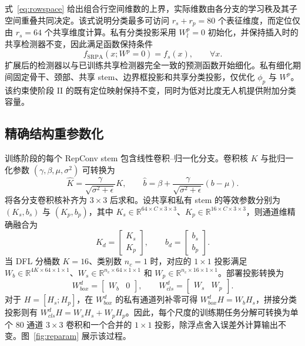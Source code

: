 式~\eqref{eq:rowspace} 给出组合行空间维数的上界，实际维数由各分支的学习秩及其子空间重叠共同决定。该式说明分类最多可访问 $r_s+r_p=80$ 个表征维度，而定位仅由 $r_s=64$ 个共享维度计算。私有分类投影采用 $W_l^p=0$ 初始化，并保持插入时的共享检测器不变，因此满足函数保持条件
\begin{equation}
f_{\mathrm{SRPA}}(x;W^p=0)=f_s(x),\qquad \forall x.
\label{eq:identity}
\end{equation}
扩展后的检测器以与已训练共享检测器完全一致的预测函数开始细化。私有细化期间固定骨干、颈部、共享 stem、边界框投影和共享分类投影，仅优化 $\phi_p$ 与 $W^p$。该约束使阶段 II 的既有定位映射保持不变，同时为低对比度无人机提供附加分类容量。

\FloatBarrier

\subsection{精确结构重参数化}
训练阶段的每个 RepConv stem 包含线性卷积--归一化分支。卷积核 $K$ 与批归一化参数 $(\gamma,\beta,\mu,\sigma^2)$ 可转换为
\begin{equation}
\widehat{K}=\frac{\gamma}{\sqrt{\sigma^2+\epsilon}}K,\qquad
\widehat{b}=\beta+\frac{\gamma}{\sqrt{\sigma^2+\epsilon}}(b-\mu).
\label{eq:bnfusion}
\end{equation}
将各分支卷积核补齐为 $3\times3$ 后求和。设共享和私有 stem 的等效参数分别为 $(K_s,b_s)$ 与 $(K_p,b_p)$，其中 $K_s\in\mathbb{R}^{64\times C\times3\times3}$、$K_p\in\mathbb{R}^{16\times C\times3\times3}$，则通道维精确融合为
\begin{equation}
K_d=\begin{bmatrix}K_s\\K_p\end{bmatrix},\qquad
b_d=\begin{bmatrix}b_s\\b_p\end{bmatrix}.
\label{eq:stemfuse}
\end{equation}
当 DFL 分桶数 $K=16$、类别数 $n_c=1$ 时，对应的 $1\times1$ 投影满足 $W_b\in\mathbb{R}^{4K\times64\times1\times1}$、$W_s\in\mathbb{R}^{n_c\times64\times1\times1}$ 和 $W_p\in\mathbb{R}^{n_c\times16\times1\times1}$。部署投影转换为
\begin{equation}
W_{box}^{d}=\begin{bmatrix}W_b&0\end{bmatrix},\qquad
W_{cls}^{d}=\begin{bmatrix}W_s&W_p\end{bmatrix}.
\label{eq:projfuse}
\end{equation}
对于 $H=[H_s;H_p]$，在 $W_{box}^{d}$ 的私有通道列补零可得 $W_{box}^{d}H=W_bH_s$，拼接分类投影则有 $W_{cls}^{d}H=W_sH_s+W_pH_p$。因此，每个尺度的训练期任务分解可转换为单个 80 通道 $3\times3$ 卷积和一个合并的 $1\times1$ 投影，除浮点舍入误差外计算输出不变。图~\ref{fig:reparam} 展示该过程。

